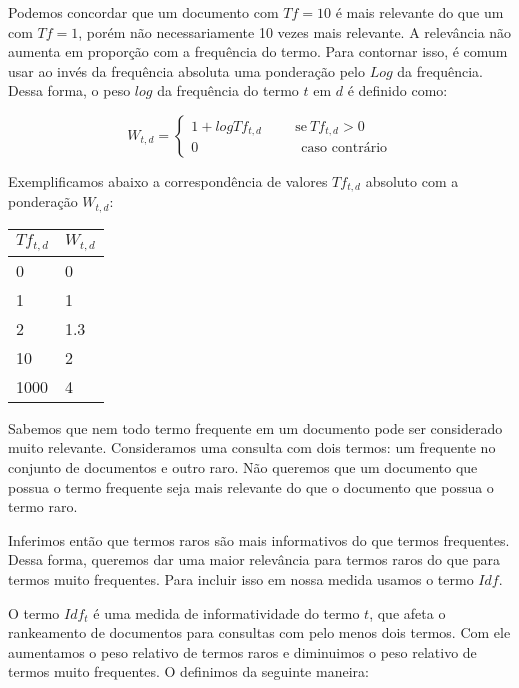 \documentclass[a4paper,12pt]{article}
\begin{document}
  Podemos concordar que um documento com $Tf=10$ é mais relevante do que um com $Tf=1$, porém não necessariamente 10 vezes mais relevante.
  A relevância não aumenta em proporção com a frequência do termo. Para contornar isso, é comum usar ao invés da frequência absoluta uma ponderação
  pelo $Log$ da frequência. Dessa forma, o peso $log$ da frequência do termo $t$ em $d$ é definido como:
  
  $$W_{t,d}=\begin{cases}
             1 + logTf_{t,d}  \hspace{1cm} \text{se} \ Tf_{t,d} > 0 \\
             0 \ \hspace{3cm} \text{caso contrário}
            \end{cases}
 $$
 
 
 Exemplificamos abaixo a correspondência de valores $Tf_{t,d}$ absoluto com a ponderação $W_{t,d}$:
 
 \begin{center}
  \begin{tabular}{ll}
    \hline
    $Tf_{t,d}$ & $W_{t,d}$\\
    \hline
    0&0\\
    1&1\\
    2&1.3\\
    10&2\\
    1000&4\\
    
  \end{tabular}
 \end{center}
 
 
  Sabemos que nem todo termo frequente em um documento pode ser considerado muito relevante. Consideramos uma consulta com dois termos:
  um frequente no conjunto de documentos e outro raro. Não queremos que um documento que possua o termo frequente seja mais relevante do que o
  documento que possua o termo raro.

  Inferimos então que termos raros são mais informativos do que termos frequentes. Dessa forma, queremos dar uma maior relevância para
  termos raros do que para termos muito frequentes. Para incluir isso em nossa medida usamos o termo $Idf$.
  
  O termo $Idf_{t}$ é uma medida de informatividade do termo $t$, que afeta o rankeamento de documentos para consultas com pelo menos dois
  termos. Com ele aumentamos o peso relativo de termos raros e diminuimos o peso relativo
  de termos muito frequentes. O definimos da seguinte maneira:
  
\end{document}
